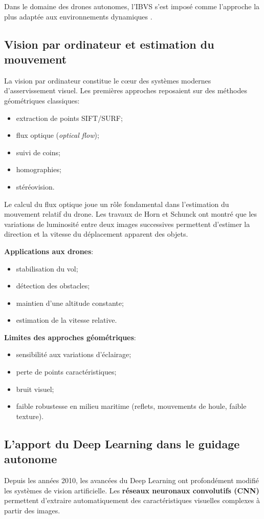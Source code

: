 \documentclass[12pt, a4paper, twoside, openright]{report}
\begin{document}
Dans le domaine des drones autonomes, l’IBVS s’est imposé comme l’approche la plus adaptée aux environnements dynamiques \cite{chaumette2006visual}.

\subsection{Vision par ordinateur et estimation du mouvement}
La vision par ordinateur constitue le cœur des systèmes modernes d’asservissement visuel. Les premières approches reposaient sur des méthodes géométriques classiques:
\begin{itemize}
    \item extraction de points SIFT/SURF;
    \item flux optique (\textit{optical flow});
    \item suivi de coins;
    \item homographies;
    \item stéréovision.
\end{itemize}

Le calcul du flux optique joue un rôle fondamental dans l’estimation du mouvement relatif du drone. Les travaux de Horn et Schunck \cite{horn1981determining} ont montré que les variations de luminosité entre deux images successives permettent d’estimer la direction et la vitesse du déplacement apparent des objets.

\textbf{Applications aux drones}:
\begin{itemize}
    \item stabilisation du vol;
    \item détection des obstacles;
    \item maintien d’une altitude constante;
    \item estimation de la vitesse relative.
\end{itemize}

\textbf{Limites des approches géométriques}:
\begin{itemize}
    \item sensibilité aux variations d’éclairage;
    \item perte de points caractéristiques;
    \item bruit visuel;
    \item faible robustesse en milieu maritime (reflets, mouvements de houle, faible texture).
\end{itemize}

\subsection{L’apport du Deep Learning dans le guidage autonome}
Depuis les années 2010, les avancées du Deep Learning ont profondément modifié les systèmes de vision artificielle. Les \textbf{réseaux neuronaux convolutifs (CNN)} permettent d’extraire automatiquement des caractéristiques visuelles complexes à partir des images.
\end{document}
